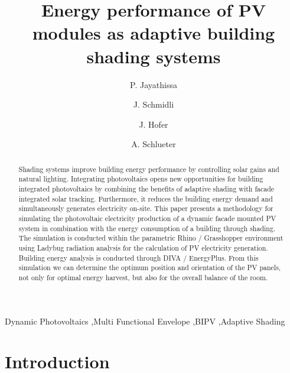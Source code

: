 \documentclass[preprint,11pt,3p]{elsarticle} %
\begin{document}
\begin{frontmatter}

\title{Energy performance of PV modules as adaptive building shading systems} 

\author[ita]{P. Jayathissa}
\address[ita]{Architecture and Building Systems, Institute of Technology in Architecture, Department of Architecture, ETH Zurich, Switzerland} 

\author[ita]{J. Schmidli}

\author[ita]{J. Hofer}


\author[ita]{A. Schlueter  }




\begin{abstract}
Shading systems improve building energy performance by controlling solar gains and natural lighting. Integrating photovoltaics opens new opportunities for building integrated photovoltaics by combining the benefits of adaptive shading with facade integrated solar tracking. Furthermore, it reduces the building energy demand and simultaneously generates electricity on-site. This paper presents a methodology for simulating the photovoltaic electricity production of a dynamic facade mounted PV system in combination with the energy consumption of a building through shading.
The simulation is conducted within the parametric Rhino / Grasshopper environment using Ladybug radiation analysis for the calculation of PV electricity generation. Building energy analysis is conducted through DIVA / EnergyPlus. From this simulation we can determine the optimum position and orientation of the PV panels, not only for optimal energy harvest, but also for the overall balance of the room.

\end{abstract}

\begin{keyword}
Dynamic Photovoltaics \sep Multi Functional Envelope \sep BIPV \sep Adaptive Shading
\end{keyword}

\end{frontmatter}

\section{Introduction}
\label{ch:introduction}

\end{document}
